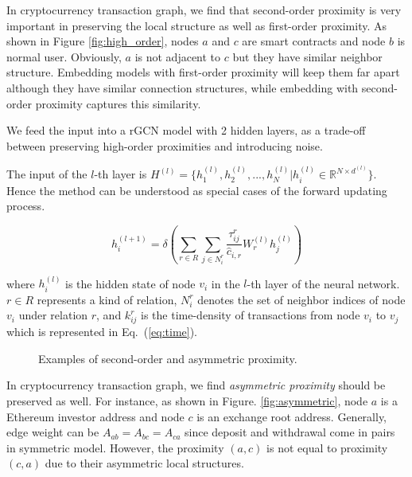 In cryptocurrency transaction graph, we find that second-order proximity is very important in preserving the local structure as well as first-order proximity. As shown in Figure \ref{fig:high_order}, nodes $a$ and $c$ are smart contracts and node $b$ is normal user. Obviously, $a$ is not adjacent to $c$  but they have similar neighbor structure. Embedding models with first-order proximity will keep them far apart although they have similar connection structures, while embedding with second-order proximity captures this similarity.

 We feed the input into a rGCN model with 2 hidden layers, as a trade-off between preserving high-order proximities and introducing noise. 
 
 The input of the $l$-th layer is $H^{(l)}=\{h_1^{(l)},h_2^{(l)},...,h_N^{(l)}|h_i^{(l)}\in \mathbb{R}^{N \times d^{(l)}}\}$. Hence the method can be understood as special cases of the forward updating process.

\begin{equation}
h_i^{(l+1)}=\delta(\sum_{r\in R} \sum_{j \in N_i^r} \frac{\tau_{ij}^r}{\hat c_{i,r}}W_r^{(l)}h_j^{(l)})
\end{equation}

\noindent where $h_i^{(l)}$ is the hidden state of node $v_i$ in the $l$-th layer of the neural network. $r \in R$ represents a kind of relation, $N_i^r$ denotes the set of neighbor indices of node $v_i$ under relation $r$, and $k_{ij}^r$ is the time-density of transactions from node $v_i$ to $v_j$ which is represented in Eq.~(\ref{eq:time}).



\begin{figure}[htbp]
	\centering
	\caption{Examples of second-order and asymmetric proximity.}

\end{figure}


In cryptocurrency transaction graph, we find \emph{asymmetric proximity} should be preserved as well. For instance, as shown in Figure. \ref{fig:asymmetric}, node $a$ is a Ethereum investor address and node $c$ is an exchange root address. Generally, edge weight can be $A_{ab}=A_{bc}=A_{ca}$ since deposit and withdrawal come in pairs in symmetric model. However, the proximity $(a,c)$ is not equal to proximity $(c,a)$ due to their asymmetric local structures.

